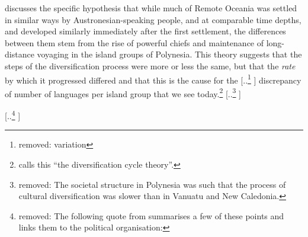 \documentclass[unnumsec,webpdf,modern,medium]{oup-authoring-template}
\providecommand{\DIFaddtex}[1]{{\protect\color{blue} \sf #1}} %
\providecommand{\DIFdeltex}[1]{{\protect\color{red} [..\footnote{removed: #1} ]}} %
\providecommand{\DIFaddbegin}{} %
\providecommand{\DIFaddend}{} %
\providecommand{\DIFdelbegin}{} %
\providecommand{\DIFdelend}{} %
\providecommand{\DIFadd}[1]{\texorpdfstring{\DIFaddtex{#1}}{#1}} %
\providecommand{\DIFdel}[1]{\texorpdfstring{\DIFdeltex{#1}}{}} %
\newcommand{\DIFscaledelfig}{0.5}
\newlength{\DIFdelgraphicswidth} %
\newlength{\DIFdelgraphicsheight} %
\newcommand{\DIFaddincludegraphics}[2][]{{\color{blue}\fbox{\DIFOincludegraphics[#1]{#2}}}} %
\newcommand{\DIFdelincludegraphics}[2][]{%
\sbox{\DIFdelgraphicsbox}{\DIFOincludegraphics[#1]{#2}}%
\settoboxwidth{\DIFdelgraphicswidth}{\DIFdelgraphicsbox} %
\settoboxtotalheight{\DIFdelgraphicsheight}{\DIFdelgraphicsbox} %
\scalebox{\DIFscaledelfig}{%
\parbox[b]{\DIFdelgraphicswidth}{\usebox{\DIFdelgraphicsbox}\\[-\baselineskip] \rule{\DIFdelgraphicswidth}{0em}}\llap{\resizebox{\DIFdelgraphicswidth}{\DIFdelgraphicsheight}{%
\setlength{\unitlength}{\DIFdelgraphicswidth}%
\begin{picture}(1,1)%
\thicklines\linethickness{2pt} %
{\color[rgb]{1,0,0}\put(0,0){\framebox(1,1){}}}%
{\color[rgb]{1,0,0}\put(0,0){\line( 1,1){1}}}%
{\color[rgb]{1,0,0}\put(0,1){\line(1,-1){1}}}%
\end{picture}%
}\hspace*{3pt}}} %
} %
\DeclareRobustCommand{\DIFaddbegin}{\DIFOaddbegin \let\includegraphics\DIFaddincludegraphics} %
\DeclareRobustCommand{\DIFaddend}{\DIFOaddend \let\includegraphics\DIFOincludegraphics} %
\DeclareRobustCommand{\DIFdelbegin}{\DIFOdelbegin \let\includegraphics\DIFdelincludegraphics} %
\DeclareRobustCommand{\DIFdelend}{\DIFOaddend \let\includegraphics\DIFOincludegraphics} %
\begin{document}
\citet{pawley81, pawley2007} discusses the specific hypothesis that while much of Remote Oceania was settled in similar ways by Austronesian-speaking people, and at comparable time depths, and developed similarly immediately after the first settlement, the differences between them stem from the rise of powerful chiefs and maintenance of long-distance voyaging in the island groups of Polynesia. This theory suggests that the steps of the diversification process were more or less the same, but that the \emph{rate} by which it progressed differed and that this is the cause for the \DIFdelbegin \DIFdel{variation }\DIFdelend \DIFaddbegin \DIFadd{discrepancy of number of languages per island group that }\DIFaddend we see today.\footnote{\citet{lynch1981melanesian} calls this ``the diversification cycle theory''.} 
\DIFdelbegin \DIFdel{The societal structure in Polynesia was such that the process of cultural diversification was slower than in Vanuatu and New Caledonia. 
}\DIFdelend 

\DIFdelbegin \DIFdel{The following quote from \citet{pawley2007} summarises a few of these points and links them to the political organisation:
}\DIFdelend %

\DIFaddbegin 

\DIFaddend %
\end{document}
